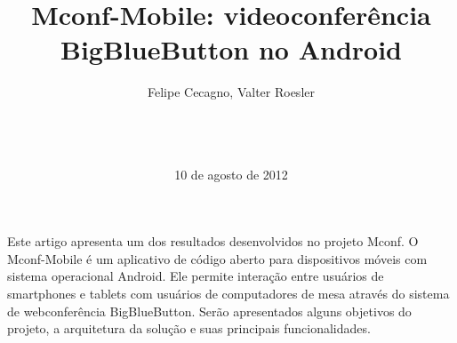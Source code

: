 \documentclass{acm_proc_article-sp}
\begin{document}
\title{Mconf-Mobile: videoconferência \\BigBlueButton no Android}
%
%
%
%
%

%
\author{
%
%
Felipe Cecagno,
Valter Roesler\\
       \\
       \\
       \\
}
\date{10 de agosto de 2012}

\maketitle
\begin{resumo}
  Este artigo apresenta um dos resultados desenvolvidos no projeto Mconf. O Mconf-Mobile é um aplicativo de código aberto para dispositivos móveis com sistema operacional Android. Ele permite interação entre usuários de smartphones e tablets com usuários de computadores de mesa através do sistema de webconferência BigBlueButton. Serão apresentados alguns objetivos do projeto, a arquitetura da solução e suas principais funcionalidades.
\end{resumo}
\end{document}

